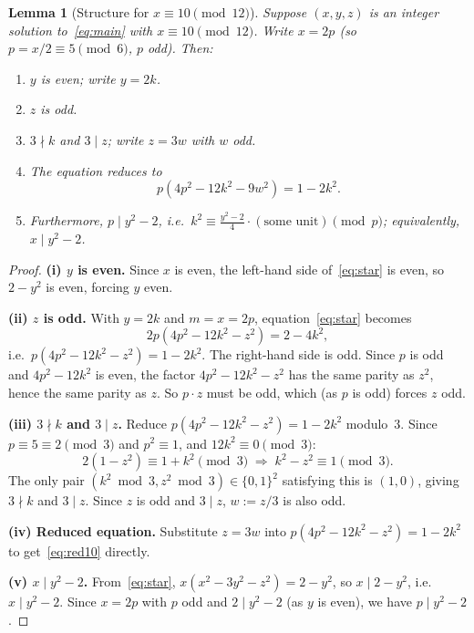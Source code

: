 \documentclass[12pt, a4paper]{amsart}
\theoremstyle{plain}
\newtheorem{lemma}[theorem]{Lemma}
\theoremstyle{definition}
\begin{document}
\begin{lemma}[Structure for $x \equiv 10 \pmod{12}$]\label{lem:structure10}
  Suppose $(x,y,z)$ is an integer solution to~\eqref{eq:main} with
  $x \equiv 10 \pmod{12}$.  Write $x = 2p$ (so $p = x/2 \equiv 5 \pmod{6}$,
  $p$ odd).  Then:
  \begin{enumerate}[label=(\roman*)]
    \item $y$ is even; write $y = 2k$.
    \item $z$ is odd.
    \item $3 \nmid k$ and $3 \mid z$; write $z = 3w$ with $w$ odd.
    \item The equation reduces to
          \begin{equation*}\label{eq:red10}\tag{$\star\star$}
            p\!\left(4p^2 - 12k^2 - 9w^2\right) = 1 - 2k^2.
          \end{equation*}
    \item Furthermore, $p \mid y^2 - 2$, i.e.\ $k^2 \equiv \tfrac{y^2-2}{4}
          \cdot(\text{some unit})\pmod{p}$; equivalently, $x \mid y^2 - 2$.
  \end{enumerate}
\end{lemma}

\begin{proof}
  \textbf{(i) $y$ is even.}
  Since $x$ is even, the left-hand side of~\eqref{eq:star} is even, so
  $2 - y^2$ is even, forcing $y$ even.

  \textbf{(ii) $z$ is odd.}
  With $y = 2k$ and $m = x = 2p$, equation~\eqref{eq:star} becomes
  \[
    2p\!\left(4p^2 - 12k^2 - z^2\right) = 2 - 4k^2,
  \]
  i.e.\ $p(4p^2 - 12k^2 - z^2) = 1 - 2k^2$.
  The right-hand side is odd.  Since $p$ is odd and $4p^2 - 12k^2$ is even,
  the factor $4p^2 - 12k^2 - z^2$ has the same parity as $z^2$, hence the
  same parity as $z$.  So $p \cdot z$ must be odd, which
  (as $p$ is odd) forces $z$ odd.

  \textbf{(iii) $3 \nmid k$ and $3 \mid z$.}
  Reduce $p(4p^2 - 12k^2 - z^2) = 1 - 2k^2$ modulo~$3$.
  Since $p \equiv 5 \equiv 2 \pmod{3}$ and $p^2 \equiv 1$, and
  $12k^2 \equiv 0 \pmod{3}$:
  \[
    2(1 - z^2) \equiv 1 + k^2 \pmod{3}
    \;\Longrightarrow\;
    k^2 - z^2 \equiv 1 \pmod{3}.
  \]
  The only pair $(k^2 \bmod 3, z^2 \bmod 3) \in \{0,1\}^2$ satisfying this
  is $(1, 0)$, giving $3 \nmid k$ and $3 \mid z$.
  Since $z$ is odd and $3 \mid z$, $w := z/3$ is also odd.

  \textbf{(iv) Reduced equation.}
  Substitute $z = 3w$ into $p(4p^2 - 12k^2 - z^2) = 1 - 2k^2$
  to get~\eqref{eq:red10} directly.

  \textbf{(v) $x \mid y^2 - 2$.}
  From~\eqref{eq:star}, $x(x^2 - 3y^2 - z^2) = 2 - y^2$, so
  $x \mid 2 - y^2$, i.e.\ $x \mid y^2 - 2$.  Since $x = 2p$ with $p$ odd
  and $2 \mid y^2 - 2$ (as $y$ is even), we have $p \mid y^2 - 2$.
\end{proof}
\end{document}
